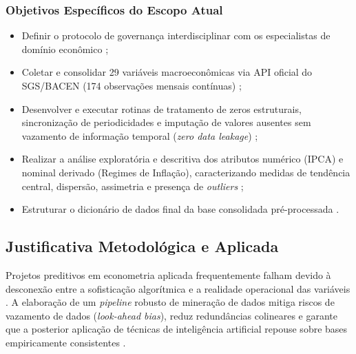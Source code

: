 \documentclass[10pt,twoside]{article}
\begin{document}
\subsubsection{Objetivos Específicos do Escopo Atual}
\begin{itemize}[leftmargin=1.5em]
    \item Definir o protocolo de governança interdisciplinar com os especialistas de domínio econômico \cite{ref2, ref14};
    \item Coletar e consolidar 29 variáveis macroeconômicas via API oficial do SGS/BACEN (174 observações mensais contínuas) \cite{ref2, ref10};
    \item Desenvolver e executar rotinas de tratamento de zeros estruturais, sincronização de periodicidades e imputação de valores ausentes sem vazamento de informação temporal (\textit{zero data leakage}) \cite{ref7, ref14};
    \item Realizar a análise exploratória e descritiva dos atributos numérico (IPCA) e nominal derivado (Regimes de Inflação), caracterizando medidas de tendência central, dispersão, assimetria e presença de \textit{outliers} \cite{ref7, ref10};
    \item Estruturar o dicionário de dados final da base consolidada pré-processada \cite{ref2, ref15}.
\end{itemize}

\subsection{Justificativa Metodológica e Aplicada}
Projetos preditivos em econometria aplicada frequentemente falham devido à desconexão entre a sofisticação algorítmica e a realidade operacional das variáveis \cite{ref6, ref12}. A elaboração de um \textit{pipeline} robusto de mineração de dados mitiga riscos de vazamento de dados (\textit{look-ahead bias}), reduz redundâncias colineares e garante que a posterior aplicação de técnicas de inteligência artificial repouse sobre bases empiricamente consistentes \cite{ref6, ref7, ref14}.
\end{document}
